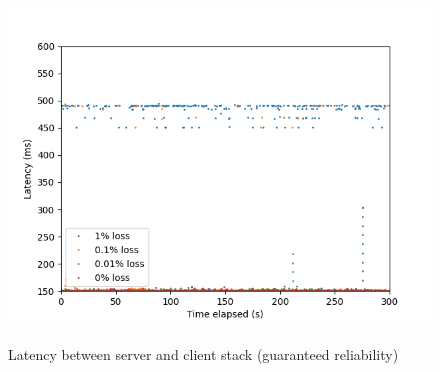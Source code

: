 \documentclass{mpaper}
\begin{document}
\begin{figure}
{   \includegraphics[scale=0.5]{images/graphics-reliable/150ms-stack-latencies-combined-reliable.png}
   \label{stack-rel-150}
 }
 \caption{Latency between server and client stack (guaranteed reliability)}
 \label{stack-rel}
\end{figure}

\clearpage
\end{document}
